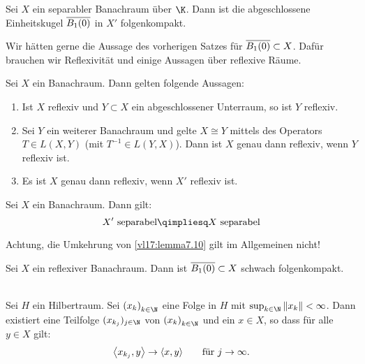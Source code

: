 \begin{thSatz} \label{vl17:satz7.8}
    Sei $X$ ein separabler Banachraum über $\K$. Dann ist die abgeschlossene
    Einheitskugel $\overline{B_1(0)}$ in $X'$ \schwachstern folgenkompakt.
\end{thSatz}


Wir hätten gerne die Aussage des vorherigen Satzes für
$\overline{B_1(0)}\subset X$. Dafür brauchen wir Reflexivität und
einige Aussagen über reflexive Räume.

\begin{thLemma} \label{vl17:lemma7.9}
    Sei $X$ ein Banachraum. Dann gelten folgende Aussagen:
    \begin{enumerate}[(1)]
        \item \label{vl17:lemma7.9:1}
            Ist $X$ reflexiv und $Y\subset X$ ein abgeschlossener Unterraum, so
            ist $Y$ reflexiv.
            
        \item \label{vl17:lemma7.9:2}
            Sei $Y$ ein weiterer Banachraum und gelte $X\cong Y$ mittels des
            Operators $T\in L(X,Y)$ (mit $T^{-1}\in L(Y,X)$). Dann ist $X$ genau
            dann reflexiv, wenn $Y$ reflexiv ist.
            
        \item \label{vl17:lemma7.9:3}
            Es ist $X$ genau dann reflexiv, wenn $X'$ reflexiv ist.
    \end{enumerate}
\end{thLemma}


\begin{thLemma} \label{vl17:lemma7.10}
    Sei $X$ ein Banachraum. Dann gilt:
    \[ X'\text{ separabel} \qimpliesq X\text{ separabel} \]
\end{thLemma}


Achtung, die Umkehrung von \cref{vl17:lemma7.10} gilt im Allgemeinen nicht!

\begin{thSatz}
    Sei $X$ ein reflexiver Banachraum. Dann ist $\overline{B_1(0)}\subset X$
    schwach folgenkompakt.
\end{thSatz}


\begin{thEmpty}\hfill\\
    \nnSatz
    Sei $H$ ein Hilbertraum. Sei $\kSeq x$ eine Folge in $H$ mit
    $\sup_{k\in\N} \, \norm{x_k} < \infty$. Dann existiert eine Teilfolge
    $(x_{k_j})_{j\in\N}$ von $\kSeq x$ und ein $x\in X$, so dass für alle
    $y\in X$ gilt:
    \[ \SP{ x_{k_j}, y } \to \SP{x,y} \fuer j\to\infty  . \]
\end{thEmpty}


